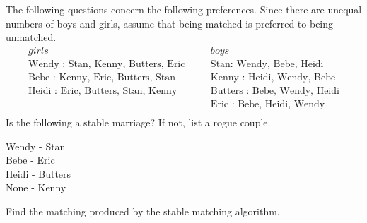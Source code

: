 \documentclass[12pt,twoside]{article}
\begin{document}
\begin{problem}{10}
The following questions concern the
following preferences. Since there are unequal numbers of boys and girls, assume that being matched is preferred to being unmatched.
\begin{eqnarray*}
girls & \quad & boys \\
\text{Wendy : Stan, Kenny, Butters, Eric} & \quad & \text{Stan: Wendy, Bebe, Heidi} \\
\text{Bebe : Kenny, Eric, Butters, Stan} & \quad & \text{Kenny : Heidi, Wendy, Bebe} \\
\text{Heidi : Eric, Butters, Stan, Kenny} & \quad & \text{Butters : Bebe, Wendy, Heidi} \\
\text{ } & \quad & \text{Eric : Bebe, Heidi, Wendy} \\
\end{eqnarray*}
\bparts
{}
Is the following a stable marriage? If not, list a rogue couple.
\begin{center}
Wendy - Stan\\
Bebe - Eric\\
Heidi - Butters\\
None - Kenny \\
\end{center}

Find the matching produced by the stable matching algorithm.


\eparts
\end{problem}
\end{document}
